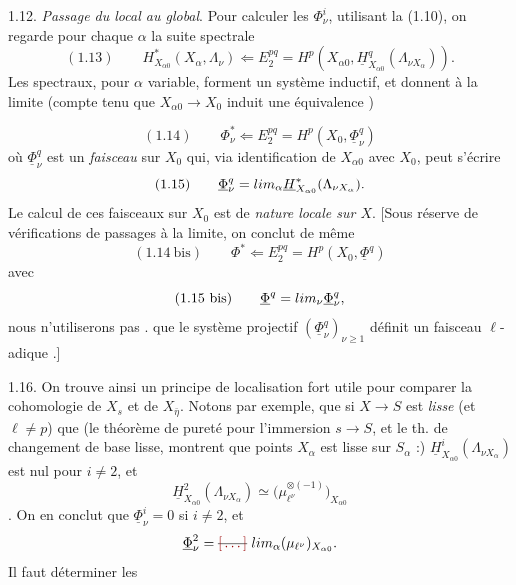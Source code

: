 \documentclass[11pt,a4paper]{article}
\begin{document}
1.12. \emph{Passage du local au global}. Pour calculer les $\Phi^i_\nu$,  utilisant la \struck{\ill{}}  (1.10), on regarde pour chaque $\alpha$ la suite spectrale
\[
(1.13) \qquad H^*_{X_{\alpha 0}}(X_\alpha, \Lambda_\nu) \Longleftarrow E_2^{pq} = H^p(X_{\alpha 0}, \underline{H}^q_{X_{\alpha 0}}(\Lambda_{\nu X_\alpha})) .
\]
Les  spectraux, pour $\alpha$ variable, forment un système inductif, et donnent à la limite (compte tenu que $X_{\alpha 0} \to X_0$ induit une équivalence )

\[
(1.14) \qquad \Phi^*_\nu \Longleftarrow E_2^{pq} = H^p(X_0, \underline{\Phi}^q_\nu)
\]
où $\underline{\Phi}^q_\nu$ est un \emph{faisceau} sur $X_0$ qui, via identification de $X_{\alpha 0}$ avec $X_0$, peut s'écrire
\[
(1.15) \qquad \underline{\Phi}^q_\nu = \varinjlim_\alpha \underline{H}^*_{X_{\alpha 0}}(\Lambda_{\nu X_\alpha}) .
\]
Le calcul de ces faisceaux sur $X_0$ est de \emph{nature locale sur $X$}. [Sous réserve  de vérifications \struck{\ill{}} de passages à la limite, on conclut de même \ill{}
\[
(1.14\ \text{bis}) \qquad \Phi^* \Longleftarrow E_2^{pq} = H^p(X_0, \underline{\Phi}^q)
\]
avec
\[
(1.15\ \text{bis}) \qquad \underline{\Phi}^q = \varprojlim_\nu \underline{\Phi}^q_\nu ,
\]
  nous n'utiliserons pas .  \ill{} \ill{}  \ill{} \ill{} que \ill{} le système projectif $(\underline{\Phi}^q_\nu)_{\nu \geq 1}$ définit un faisceau $\ell$-adique \ill{} .]

1.16. On trouve ainsi un principe de localisation fort utile pour comparer la cohomologie de $X_s$ et de $X_{\bar\eta}$. Notons par exemple,   \add{\ill{}} que si $X \to S$ est \emph{lisse} (et $\ell \neq p$) que \struck{\ill{}} (le théorème de pureté pour l'immersion $s \to S$, et le th. de changement de base lisse, montrent que  points \ill{} $X_\alpha$ est lisse sur $S_\alpha$ :) $\underline{H}^i_{X_{\alpha 0}}(\Lambda_{\nu X_\alpha})$ est nul pour $i \neq 2$, et
\[
\underline{H}^2_{X_{\alpha 0}}(\Lambda_{\nu X_\alpha}) \simeq \bigl(\mu_{\ell^\nu}^{\otimes(-1)}\bigr)_{X_{\alpha 0}}
\]
\struck{\ill{}} .
On en conclut que $\underline{\Phi}^i_\nu = 0$ si $i \neq 2$, et
\[
\underline{\Phi}^2_\nu = \text{\struck{$\ill{}$}}\ \varinjlim_\alpha (\mu_{\ell^\nu})_{X_{\alpha 0}} .
\]
Il faut déterminer les
\end{document}
